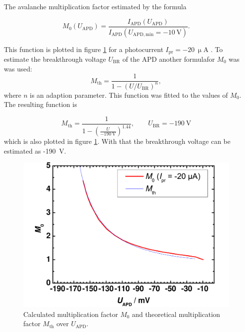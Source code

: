 The avalanche multiplication factor estimated by the formula

\begin{equation}
M_0(U_{\mathrm{APD}})=\frac{I_{\mathrm{APD}}(U_{\mathrm{APD}})}{I_{\mathrm{APD}}(U_{\mathrm{APD,min}}=-10\mathrm{~V})}.
\label{eq:M0}
\end{equation}

This function is plotted in figure \ref{fig:T3_3} for a photocurrent $I_{\mathrm{pr}}=-20~\upmu$A . To estimate the breakthrough voltage $U_{\mathrm{BR}}$ of the APD another formula\footnotemark[2] for $M_0$ was was used:
\begin{equation}
M_{\mathrm{th}} = \frac{1}{1-(U/U_{\mathrm{BR}})^n},
\label{eq:Mth}
\end{equation}
where $n$ is an adaption parameter. 
This function was fitted to the values of $M_0$. The resulting function is

\begin{equation}
M_{\mathrm{th}} = \frac{1}{1-(\frac{U}{-190~\mathrm{V}})^{1.44}},\qquad U_{\mathrm{BR}}=-190~\mathrm{V}
\label{eq:M_fit}
\end{equation}
which is also plotted in figure \ref{fig:T3_3}.
With that the breakthrough voltage can be estimated as -190~V.

\begin{figure}%
\centering
\includegraphics[width=.5\columnwidth]{Grafiken/T3_3.pdf}%
\caption{Calculated multiplication factor $M_0$ and theoretical multiplication factor $M_{\mathrm{th}}$ over $U_{\mathrm{APD}}$.}%
\label{fig:T3_3}%
\end{figure}